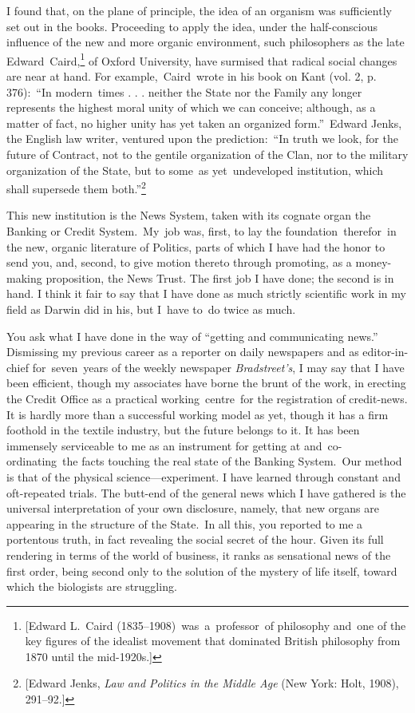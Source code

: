 \documentclass[twoside,symmetric,nobib,justified]{tufte-book}
\begin{document}
I found that, on the plane of principle, the idea of an organism was
sufficiently set out in the books. Proceeding to apply the idea, under
the half-conscious influence of the new and more organic environment,
such philosophers as the late Edward~Caird,\footnote{{[}Edward L.~Caird
  (1835--1908)~was~a~professor~of philosophy and~one of the key figures
  of the idealist movement that dominated British philosophy from 1870
  until the mid-1920s.{]}} of Oxford University, have surmised that
radical social changes are near at hand. For example,~Caird~wrote in his
book on Kant (vol. 2, p. 376):~``In modern~times . . . neither the State
nor the Family any longer represents the highest moral unity of which we
can conceive; although, as a matter of fact, no higher unity has yet
taken an organized form.''~Edward Jenks, the English law writer,
ventured upon the prediction:~``In truth we look, for the future of
Contract, not to the gentile organization of the Clan, nor to the
military organization of the State, but to some~as yet~undeveloped
institution, which shall supersede them both.''\footnote{{[}Edward
  Jenks, \emph{Law and Politics in the Middle Age} (New York: Holt,
  1908), 291--92.{]}}

This new institution is the News System, taken with its cognate organ
the Banking or Credit System.~My~job was, first, to lay the
foundation~therefor~in the new, organic literature of Politics, parts of
which I have had the honor to send you, and, second, to give motion
thereto through promoting, as a money-making proposition, the News
Trust. The first job I have done; the second is in hand. I think it fair
to say that I have done as much strictly scientific work in my field as
Darwin did in his, but I~have to~do twice as much.~

You ask what I have done in the way of ``getting and communicating
news.'' Dismissing my previous career as a reporter on daily newspapers
and as editor-in-chief for~seven~years of the weekly newspaper
\emph{Bradstreet's}, I may say that I have been efficient, though my
associates have borne the brunt of the work, in erecting the Credit
Office as a practical working~centre~for the registration of
credit-news. It is hardly more than a successful working model as yet,
though it has a firm foothold in the textile industry, but the future
belongs to it. It has been immensely serviceable to me as an instrument
for getting at and~co-ordinating~the facts touching the real state of
the Banking System.~Our method is that of the physical
science---experiment. I have learned through constant and oft-repeated
trials. The butt-end of the general news which I have gathered is the
universal interpretation of your own disclosure, namely, that new organs
are appearing in the structure of the State.~In all this, you reported
to me a portentous truth, in fact revealing the social secret of the
hour. Given its full rendering in terms of the world of business, it
ranks as sensational news of the first order, being second only to the
solution of the mystery of life itself, toward which the biologists are
struggling.~
\end{document}
